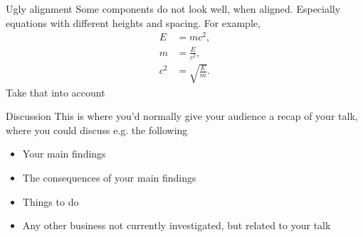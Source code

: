 \documentclass[9pt]{beamer}
\begin{document}
\begin{frame}{Ugly alignment}
    Some components do not look well, when aligned. Especially equations with different heights and spacing. For example,
    \begin{align}
         E &= mc^2, \\
        m &= \frac{E}{c^2}, \\
        c^2 &= \sqrt{\frac{E}{m}}.
    \end{align}
    Take that into account
\end{frame}

\begin{frame}{Discussion}
    This is where you’d normally give your audience a recap of your talk, where you could discuss e.g. the following
    \begin{itemize}
        \item Your main findings
        \item The consequences of your main findings
        \item Things to do
        \item Any other business not currently investigated, but related to your talk
    \end{itemize}

\end{frame}
\end{document}
